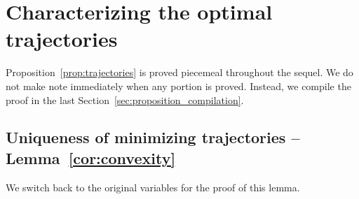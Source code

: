 \documentclass[10pt]{amsart}
\theoremstyle{definition}\newtheorem{defi}[theo]{Definition}\newtheorem{rema}[theo]{Remark}\newtheorem{exam}[theo]{Example}\newtheorem{exem}[theo]{Example}\newtheorem{nota}[theo]{Notation}
\newcommand{\1}{\mathds{1}}
\begin{document}
\section{Characterizing the optimal trajectories}\label{sec:trajectories}



Proposition~\ref{prop:trajectories} is proved piecemeal throughout the sequel. We do not make note immediately when any portion is proved. Instead, we compile the proof in the last Section~\ref{sec:proposition_compilation}.



\subsection{Uniqueness of minimizing trajectories -- Lemma~\ref{cor:convexity}}


We switch back to the original variables for the proof of this lemma.
\end{document}
